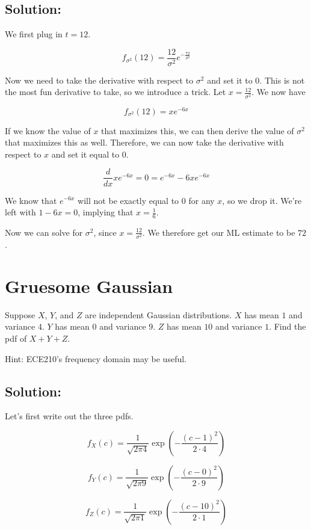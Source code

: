 \documentclass{article}
\begin{document}
\subsection{Solution:}

We first plug in $t = 12$.

$$f_{\sigma^2}(12) = \frac{12}{\sigma^2}e^{-\frac{72}{\sigma^2}}$$

Now we need to take the derivative with respect to $\sigma^2$ and set it to $0$. This is not the most fun derivative to take, so we introduce a trick. Let $x = \frac{12}{\sigma^2}$. We now have

$$f_{\sigma^2}(12) = xe^{-6x}$$

If we know the value of $x$ that maximizes this, we can then derive the value of $\sigma^2$ that maximizes this as well. Therefore, we can now take the derivative with respect to $x$ and set it equal to $0$.

$$\frac{d}{dx}xe^{-6x} = 0 = e^{-6x} - 6xe^{-6x}$$

We know that $e^{-6x}$ will not be exactly equal to $0$ for any $x$, so we drop it. We're left with $1 - 6x = 0$, implying that $x = \frac{1}{6}$.

Now we can solve for $\sigma^2$, since $x = \frac{12}{\sigma^2}$. We therefore get our ML estimate to be $\boxed{72}$.

\newpage

\section{Gruesome Gaussian}

Suppose $X$, $Y$, and $Z$ are independent Gaussian distributions. $X$ has mean $1$ and variance $4$. $Y$ has mean $0$ and variance $9$. $Z$ has mean $10$ and variance $1$. Find the pdf of $X + Y + Z$.

Hint: ECE210's frequency domain may be useful.

\subsection{Solution:}

Let's first write out the three pdfs.

$$f_X(c) = \frac{1}{\sqrt{2\pi4}} \exp \left(- \frac{(c - 1)^2}{2 \cdot 4}\right)$$

$$f_Y(c) = \frac{1}{\sqrt{2\pi9}} \exp \left(- \frac{(c - 0)^2}{2 \cdot 9}\right)$$

$$f_Z(c) = \frac{1}{\sqrt{2\pi1}} \exp \left(- \frac{(c - 10)^2}{2 \cdot 1}\right)$$
\end{document}
